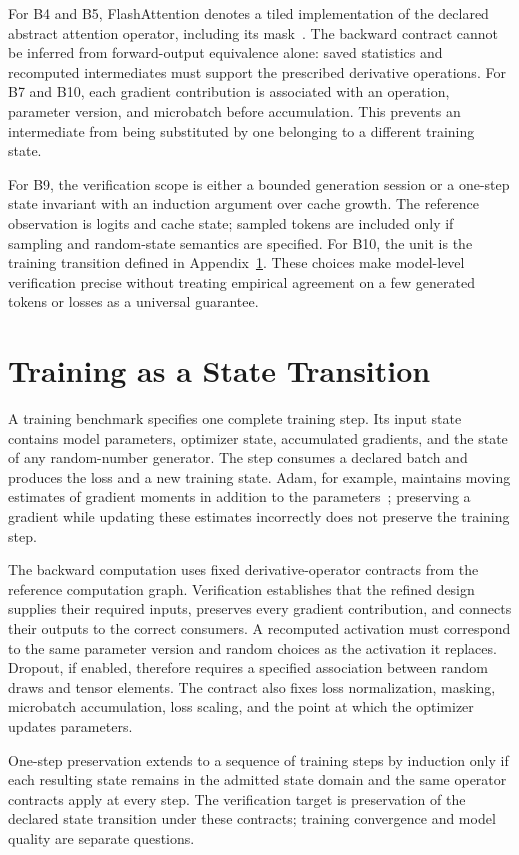 \documentclass[11pt]{article}
\begin{document}
For B4 and B5, FlashAttention denotes a tiled implementation of the declared abstract attention operator, including its mask~\cite{flashattention}. The backward contract cannot be inferred from forward-output equivalence alone: saved statistics and recomputed intermediates must support the prescribed derivative operations. For B7 and B10, each gradient contribution is associated with an operation, parameter version, and microbatch before accumulation. This prevents an intermediate from being substituted by one belonging to a different training state.

For B9, the verification scope is either a bounded generation session or a one-step state invariant with an induction argument over cache growth. The reference observation is logits and cache state; sampled tokens are included only if sampling and random-state semantics are specified. For B10, the unit is the training transition defined in Appendix~\ref{app:training}. These choices make model-level verification precise without treating empirical agreement on a few generated tokens or losses as a universal guarantee.

\section{Training as a State Transition}\label{app:training}
A training benchmark specifies one complete training step. Its input state contains model parameters, optimizer state, accumulated gradients, and the state of any random-number generator. The step consumes a declared batch and produces the loss and a new training state. Adam, for example, maintains moving estimates of gradient moments in addition to the parameters~\cite{adam}; preserving a gradient while updating these estimates incorrectly does not preserve the training step.

The backward computation uses fixed derivative-operator contracts from the reference computation graph. Verification establishes that the refined design supplies their required inputs, preserves every gradient contribution, and connects their outputs to the correct consumers. A recomputed activation must correspond to the same parameter version and random choices as the activation it replaces. Dropout, if enabled, therefore requires a specified association between random draws and tensor elements. The contract also fixes loss normalization, masking, microbatch accumulation, loss scaling, and the point at which the optimizer updates parameters.

One-step preservation extends to a sequence of training steps by induction only if each resulting state remains in the admitted state domain and the same operator contracts apply at every step. The verification target is preservation of the declared state transition under these contracts; training convergence and model quality are separate questions.
\end{document}
